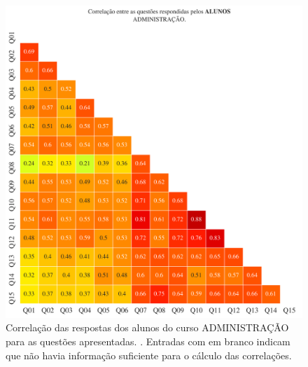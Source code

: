 \documentclass[a4paper,10pt]{article}
\begin{document}
\begin{figure}[h]
\centering
\includegraphics[width=0.999\linewidth]{matriz_corr__alunos_1178684.png}
\caption{\label{fig:corr_alunos}Correlação das respostas dos alunos do curso ADMINISTRAÇÃO para as questões apresentadas. . Entradas com em branco indicam que não havia informação suficiente para o cálculo das correlações.}
\end{figure}
\end{document}
